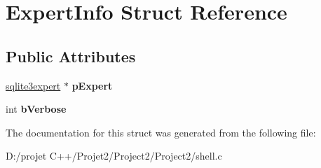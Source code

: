 \hypertarget{struct_expert_info}{}\section{Expert\+Info Struct Reference}
\label{struct_expert_info}
\subsection*{Public Attributes}
\begin{DoxyCompactItemize}
\item 
\mbox{\label{struct_expert_info_a590dab1fadb28a091f2d3a7f7b528db3}} 
\mbox{\hyperlink{structsqlite3expert}{sqlite3expert}} $\ast$ {\bfseries p\+Expert}
\item 
\mbox{\label{struct_expert_info_a74f29387f60ba4c29f31760c52ec5321}} 
int {\bfseries b\+Verbose}
\end{DoxyCompactItemize}


The documentation for this struct was generated from the following file\+:\begin{DoxyCompactItemize}
\item 
D\+:/projet C++/\+Projet2/\+Project2/\+Project2/shell.\+c\end{DoxyCompactItemize}
